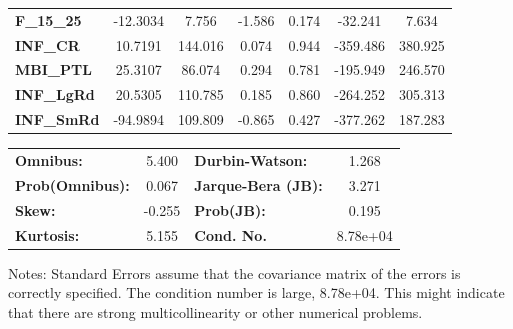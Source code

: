 \begin{center}
\begin{tabular}{lcccccc}
\textbf{F\_15\_25} &     -12.3034  &        7.756     &    -1.586  &         0.174        &      -32.241    &        7.634     \\
\textbf{INF\_CR}   &      10.7191  &      144.016     &     0.074  &         0.944        &     -359.486    &      380.925     \\
\textbf{MBI\_PTL}  &      25.3107  &       86.074     &     0.294  &         0.781        &     -195.949    &      246.570     \\
\textbf{INF\_LgRd} &      20.5305  &      110.785     &     0.185  &         0.860        &     -264.252    &      305.313     \\
\textbf{INF\_SmRd} &     -94.9894  &      109.809     &    -0.865  &         0.427        &     -377.262    &      187.283     \\
\bottomrule
\end{tabular}
\begin{tabular}{lclc}
\textbf{Omnibus:}       &  5.400 & \textbf{  Durbin-Watson:     } &    1.268  \\
\textbf{Prob(Omnibus):} &  0.067 & \textbf{  Jarque-Bera (JB):  } &    3.271  \\
\textbf{Skew:}          & -0.255 & \textbf{  Prob(JB):          } &    0.195  \\
\textbf{Kurtosis:}      &  5.155 & \textbf{  Cond. No.          } & 8.78e+04  \\
\bottomrule
\end{tabular}
\end{center}

Notes: \newline
 [1] Standard Errors assume that the covariance matrix of the errors is correctly specified. \newline
 [2] The condition number is large, 8.78e+04. This might indicate that there are \newline
 strong multicollinearity or other numerical problems.